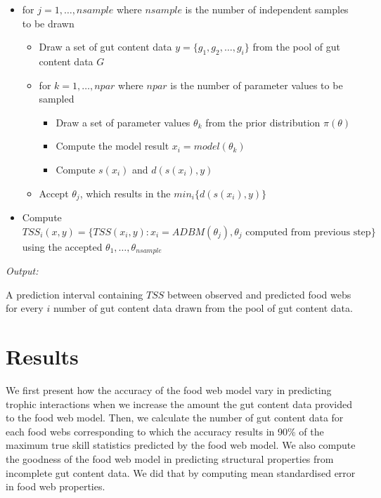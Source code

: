 \documentclass{article}
\begin{document}
\begin{itemize}
\item
  for \(j = 1, \dots, nsample\) where \(nsample\) is the number of
  independent samples to be drawn

  \begin{itemize}
  \item
    Draw a set of gut content data \(y = \{g_1, g_2, \dots, g_i\}\) from
    the pool of gut content data \(G\)
  \item
    for \(k = 1, \dots, npar\) where \(npar\) is the number of parameter
    values to be sampled

    \begin{itemize}
    \item
      Draw a set of parameter values \(\theta_k\) from the prior
      distribution \(\pi(\theta)\)
    \item
      Compute the model result \(x_i = model(\theta_k)\)
    \item
      Compute \(s(x_i)\) and \(d(s(x_i), y)\)
    \end{itemize}
  \item
    Accept \(\theta_j\), which results in the \(min_i\{d(s(x_i), y)\}\)
  \end{itemize}
\item
  Compute
  \(TSS_{i}(x, y) = \{TSS(x_i,y): x_i = ADBM(\theta_j), \theta_j \text{ computed from previous step}\}\)
  using the accepted \(\theta_1, \dots, \theta_{nsample}\)
\end{itemize}

\emph{Output:}

A prediction interval containing \(TSS\) between observed and predicted
food webs for every \(i\) number of gut content data drawn from the pool
of gut content data.

\hypertarget{results}{%
\section{Results}\label{results}}

We first present how the accuracy of the food web model vary in
predicting trophic interactions when we increase the amount the gut
content data provided to the food web model. Then, we calculate the
number of gut content data for each food webs corresponding to which the
accuracy results in 90\% of the maximum true skill statistics predicted
by the food web model. We also compute the goodness of the food web
model in predicting structural properties from incomplete gut content
data. We did that by computing mean standardised error in food web
properties.
\end{document}
